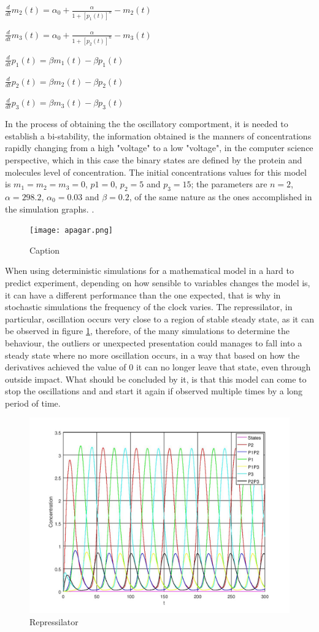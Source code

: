 \documentclass[12pt]{article}
\begin{document}
$\frac{d}{dt}m_{2}(t) = \alpha_{0} + \frac{\alpha}{1 + [p_{1}(t)]^{n}} - m_{2}(t)$

$\frac{d}{dt}m_{3}(t) = \alpha_{0} + \frac{\alpha}{1 + [p_{2}(t)]^{n}} - m_{3}(t)$

$\frac{d}{dt}p_{1}(t) = \beta{m_{1}}(t) - \beta{p_{1}}(t)$

$\frac{d}{dt}p_{2}(t) = \beta{m_{2}}(t) - \beta{p_{2}}(t)$

$\frac{d}{dt}p_{3}(t) = \beta{m_{3}}(t) - \beta{p_{3}}(t)$ 

In the process of obtaining the the oscillatory comportment, it is needed to establish a bi-stability, the information obtained is the manners of concentrations rapidly changing from a high "voltage" to a low "voltage", in the computer science perspective, which in this case the binary states are defined by the protein and molecules level of concentration. The initial concentrations values for this model is $m_{1} = m_{2} = m_{3} = 0$, $p1 = 0$, $p_{2} = 5$ and $p_{3} = 15$; the parameters are $n = 2$, $\alpha = 298.2$, $\alpha_{0} = 0.03$ and $\beta = 0.2$, of the same nature as the ones accomplished in the simulation graphs. \cite{ingalls2013mathematical}.

\begin{figure}[h]
    \centering
    \texttt{[image: apagar.png]}
    \caption{Caption}
    \label{fig:phase_plane_repressilator}
\end{figure}

When using deterministic simulations for a mathematical model in a hard to predict experiment, depending on how sensible to variables changes the model is, it can have a different performance than the one expected, that is why in stochastic simulations the frequency of the clock varies. The repressilator, in particular, oscillation occurs very close to a region of stable steady state, as it can be observed in figure \ref{fig:phase_plane_repressilator}, therefore, of the many simulations to determine the behaviour, the outliers or unexpected presentation could manages to fall into a steady state where no more oscillation occurs, in a way that based on how the derivatives achieved the value of 0 it can no longer leave that state, even through outside impact. What should be concluded by it, is that this model can come to stop the oscillations and and start it again if observed multiple times by a long period of time.

\begin{figure}[ht]
\centering
\includegraphics[width=.5\textwidth]{repressilator.jpg}
\caption{Repressilator}
\label{fig:repressilator}
\end{figure}
\end{document}
